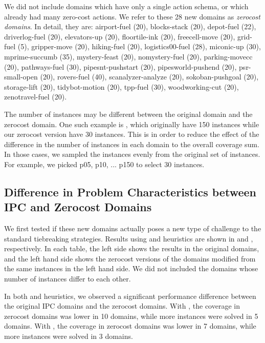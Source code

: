 We did not
include domains which have only a single action schema, or which already had many zero-cost actions.
We refer to these 28 new domains as \emph{zerocost domains}.
In detail, they are:
airport-fuel (20), blocks-stack (20), depot-fuel (22), driverlog-fuel (20),
elevators-up (20), floortile-ink (20), freecell-move (20), grid-fuel (5),
gripper-move (20), hiking-fuel (20), logistics00-fuel (28), miconic-up (30),
mprime-succumb (35), mystery-feast (20), nomystery-fuel (20),
parking-movecc (20), pathways-fuel (30), pipesnt-pushstart (20),
pipesworld-pushend (20), psr-small-open (20), rovers-fuel (40),
scanalyzer-analyze (20), sokoban-pushgoal (20), storage-lift (20),
tidybot-motion (20), tpp-fuel (30), woodworking-cut (20),
zenotravel-fuel (20).

The number of instances may be different between the original domain and
the zerocost domain. One such example is , which
originally have 150 instances while our zerocost version have
30 instances.
This is in order to reduce the effect of the difference in the
number of instances in each domain to the overall coverage sum.
In those cases, we sampled the instances evenly from the original set
of instances. For example, we picked p05, p10, ... p150 to select 30
instances.

\subsection{Difference in Problem Characteristics between IPC and Zerocost Domains}

We first tested if these new domains actually poses a new type of challenge to the
standard tiebreaking strategies. Results using \lmcut and \mands
heuristics are shown in  and
, respectively. In each table, the left
side shows the results in the original domains, and the left hand side
shows the zerocost versions of the domains modified from the same
instances in the left hand side. We did not included the domains whose
number of instances differ to each other.

In both \lmcut and \mands heuristics, we observed a significant
performance difference between the original IPC domains and the zerocost
domains. With \lmcut, the coverage in zerocost domains
was lower in 10 domains, while more instances were solved
in 5 domains. With \mands, the coverage in zerocost domains was lower in 7 domains, while
more instances were solved in 3 domains.

